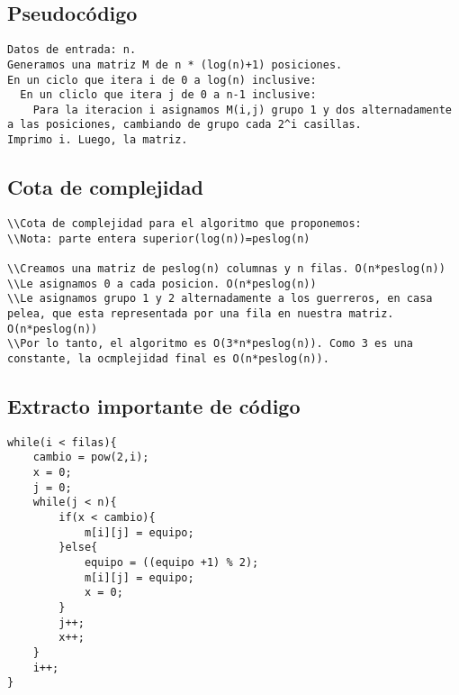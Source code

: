 \documentclass[10pt,a4paper]{article}
\begin{document}
\subsection{Pseudocódigo}
\begin{verbatim}
Datos de entrada: n.
Generamos una matriz M de n * (log(n)+1) posiciones.
En un ciclo que itera i de 0 a log(n) inclusive:
  En un cliclo que itera j de 0 a n-1 inclusive:
    Para la iteracion i asignamos M(i,j) grupo 1 y dos alternadamente a las posiciones, cambiando de grupo cada 2^i casillas.
Imprimo i. Luego, la matriz.
\end{verbatim}

\subsection{Cota de complejidad}
\begin{verbatim}
\\Cota de complejidad para el algoritmo que proponemos:
\\Nota: parte entera superior(log(n))=peslog(n)

\\Creamos una matriz de peslog(n) columnas y n filas. O(n*peslog(n))
\\Le asignamos 0 a cada posicion. O(n*peslog(n))
\\Le asignamos grupo 1 y 2 alternadamente a los guerreros, en casa pelea, que esta representada por una fila en nuestra matriz. O(n*peslog(n))
\\Por lo tanto, el algoritmo es O(3*n*peslog(n)). Como 3 es una constante, la ocmplejidad final es O(n*peslog(n)).
\end{verbatim}

\subsection{Extracto importante de código}
\begin{lstlisting}
while(i < filas){
	cambio = pow(2,i);
	x = 0;
	j = 0;
	while(j < n){
		if(x < cambio){
			m[i][j] = equipo;
		}else{
			equipo = ((equipo +1) % 2);
			m[i][j] = equipo;
			x = 0;
		}
		j++;
		x++;
	}
	i++;
}
\end{lstlisting}
\subsection{}
\end{document}

